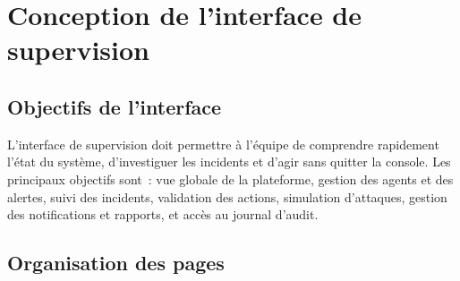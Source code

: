\section{Conception de l'interface de supervision}

\subsection{Objectifs de l'interface}

L'interface de supervision doit permettre à l'équipe de comprendre rapidement l'état du système, d'investiguer les incidents et d'agir sans quitter la console. Les principaux objectifs sont~: vue globale de la plateforme, gestion des agents et des alertes, suivi des incidents, validation des actions, simulation d'attaques, gestion des notifications et rapports, et accès au journal d'audit.

\newpage
\subsection{Organisation des pages}

